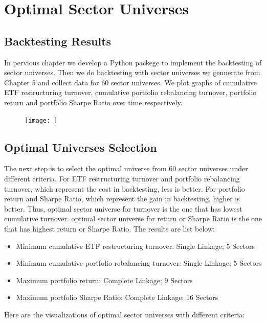\documentclass[../main.tex]{subfiles}
\begin{document}
    
\chapter{Optimal Sector Universes}

\section{Backtesting Results}

In pervious chapter we develop a Python packege to implement the backtesting of sector universes. Then we do backtesting with sector universes we gennerate from Chapter 5 and collect data for 60 sector universes. We plot graphs of cumulative ETF restructuring turnover, cumulative portfolio rebalancing turnover, portfolio return and portfolio Sharpe Ratio over time respectively. 

\begin{figure}[H]
    \texttt{[image: ]}
    \caption{}
    \label{}
\end{figure} 

\section{Optimal Universes Selection}

The next step is to select the optimal universe from 60 sector universes under different criteria. For ETF restructuring turnover and portfolio rebalancing turnover, which represent the cost in backtesting, less is better. For portfolio return and Sharpe Ratio, which represent the gain in backtesting, higher is better. Thus, optimal sector universe for turnover is the one that has lowest cumulative turnover. optimal sector universe for return or Sharpe Ratio is the one that has highest return or Sharpe Ratio. The results are list below: 

\begin{itemize}
	\item Minimum cumulative ETF restructuring turnover: Single Linkage; 5 Sectors
	\item Minimum cumulative portfolio rebalancing turnover: Single Linkage; 5 Sectors
	\item Maximum portfolio return: Complete Linkage; 9 Sectors
	\item Maximum portfolio Sharpe Ratio: Complete Linkage; 16 Sectors
\end{itemize}
    
Here are the visualizations of optimal sector universes with different criteria:
\end{document}
